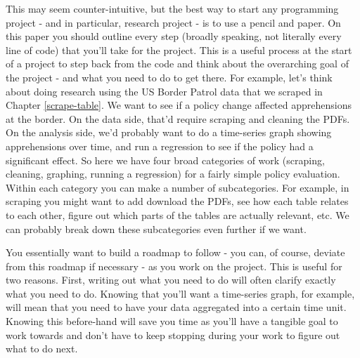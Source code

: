 \documentclass[
  12pt,
  openany]{book}
\begin{document}
This may seem counter-intuitive, but the best way to start any programming project - and in particular, research project - is to use a pencil and paper. On this paper you should outline every step (broadly speaking, not literally every line of code) that you'll take for the project. This is a useful process at the start of a project to step back from the code and think about the overarching goal of the project - and what you need to do to get there. For example, let's think about doing research using the US Border Patrol data that we scraped in Chapter \ref{scrape-table}. We want to see if a policy change affected apprehensions at the border. On the data side, that'd require scraping and cleaning the PDFs. On the analysis side, we'd probably want to do a time-series graph showing apprehensions over time, and run a regression to see if the policy had a significant effect. So here we have four broad categories of work (scraping, cleaning, graphing, running a regression) for a fairly simple policy evaluation. Within each category you can make a number of subcategories. For example, in scraping you might want to add download the PDFs, see how each table relates to each other, figure out which parts of the tables are actually relevant, etc. We can probably break down these subcategories even further if we want.

You essentially want to build a roadmap to follow - you can, of course, deviate from this roadmap if necessary - as you work on the project. This is useful for two reasons. First, writing out what you need to do will often clarify exactly what you need to do. Knowing that you'll want a time-series graph, for example, will mean that you need to have your data aggregated into a certain time unit. Knowing this before-hand will save you time as you'll have a tangible goal to work towards and don't have to keep stopping during your work to figure out what to do next.
\end{document}
